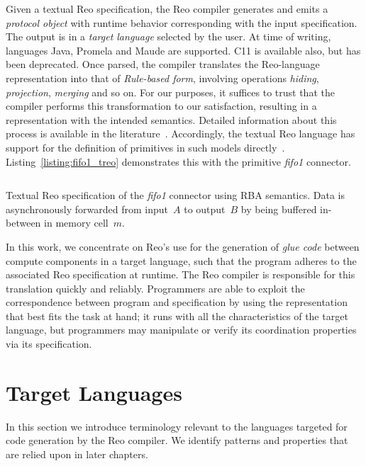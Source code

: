 Given a textual Reo specification, the Reo compiler generates and emits a \textit{protocol object} with runtime behavior corresponding with the input specification. The output is in a \textit{target language} selected by the user. At time of writing, languages Java, Promela and Maude are supported. C11 is available also, but has been deprecated. Once parsed, the compiler translates the Reo-language representation into that of \textit{Rule-based form}, involving operations \textit{hiding}, \textit{projection}, \textit{merging} and so on. For our purposes, it suffices to trust that the compiler performs this transformation to our satisfaction, resulting in a representation with the intended semantics. Detailed information about this process is available in the literature~\cite{arbab2004reo, arbab2005abstract, dokter2018rule}. Accordingly, the textual Reo language has support for the definition of primitives in such models directly~\cite{dokter2018treo}. Listing~\ref{listing:fifo1_treo} demonstrates this with the primitive \textit{fifo1} connector. 


\begin{listing}[ht]
	\inputminted[]{text}{fifo1.rba.treo}
	\caption[Fifo1 connector specfication in textual Reo language.]{Textual Reo specification of the \textit{fifo1} connector using RBA semantics. Data is asynchronously forwarded from input~$A$ to output~$B$ by being buffered in-between in memory cell~$m$.}
	\label{listing:fifo1_treo}
\end{listing}

In this work, we concentrate on Reo's use for the generation of \textit{glue code} between compute components in a target language, such that the program adheres to the associated Reo specification at runtime. The Reo compiler is responsible for this translation quickly and reliably. Programmers are able to exploit the correspondence between program and specification by using the representation that best fits the task at hand; it runs with all the characteristics of the target language, but programmers may manipulate or verify its coordination properties via its specification.


\section{Target Languages}
In this section we introduce terminology relevant to the languages targeted for code generation by the Reo compiler. We identify patterns and properties that are relied upon in later chapters.

